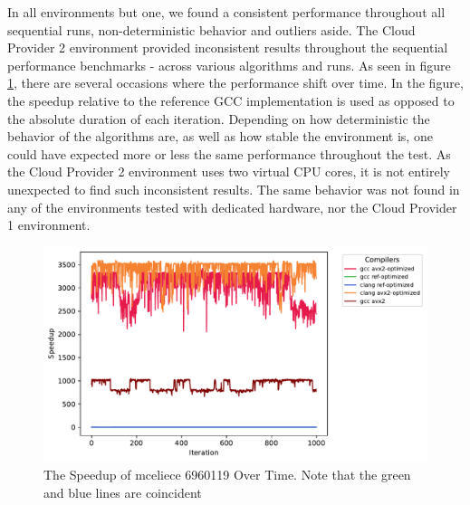 

In all environments but one, we found a consistent performance throughout all sequential runs, non-deterministic behavior and outliers aside. The Cloud Provider 2 environment provided inconsistent results throughout the sequential performance benchmarks - across various algorithms and runs. As seen in figure \ref{figure:results:sequential:mceliece-decrpyt-cloud-provider-2}, there are several occasions where the performance shift over time. In the figure, the speedup relative to the reference GCC implementation is used as opposed to the absolute duration of each iteration. Depending on how deterministic the behavior of the algorithms are, as well as how stable the environment is, one could have expected more or less the same performance throughout the test. As the Cloud Provider 2 environment uses two virtual CPU cores, it is not entirely unexpected to find such inconsistent results. The same behavior was not found in any of the environments tested with dedicated hardware, nor the Cloud Provider 1 environment.

\begin{figure}
    \centering
    \includegraphics[scale=0.75]{chapters/results/sequential/mceliece_6960119_decrypt_Cloud Provider 2.pdf}
    \caption{The Speedup of \gls{mceliece} 6960119 Over Time. Note that the green and blue lines are coincident}
    \label{figure:results:sequential:mceliece-decrpyt-cloud-provider-2}
\end{figure}

